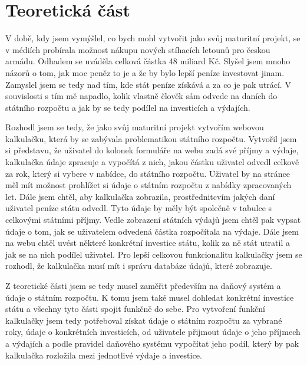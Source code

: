 \documentclass[11pt,a4paper,twoside,openright]{report}
\begin{document}


\setcounter{tocdepth}{2}
\tableofcontents

\chapter{Teoretická část}
\pagestyle{fancy}

V době, kdy jsem vymýšlel, co bych mohl vytvořit jako svůj maturitní projekt,
se v médiích probírala možnost nákupu nových stíhacích letounů pro českou armádu.
Odhadem se uváděla celková částka 48 miliard Kč. Slyšel jsem mnoho názorů o tom,
jak moc peněz to je a že by bylo lepší peníze investovat jinam. Zamyslel jsem se
tedy nad tím, kde stát peníze získává a za co je pak utrácí. V souvislosti s tím mě napadlo,
kolik vlastně člověk sám odvede na daních do státního rozpočtu a jak by se tedy
podílel na investicích a výdajích. 

Rozhodl jsem se tedy, že jako svůj maturitní projekt vytvořím webovou kalkulačku,
která by se zabývala problematikou státního rozpočtu. Vytvořil jsem si představu,
že uživatel do kolonek formuláře na webu zadá své příjmy a výdaje, kalkulačka údaje
zpracuje a vypočítá z nich, jakou částku uživatel odvedl celkově za rok, který si
vybere v nabídce, do státního rozpočtu. Uživatel by na stránce měl mít možnost prohlížet
si údaje o státním rozpočtu z nabídky zpracovaných let. Dále jsem chtěl, aby kalkulačka
zobrazila, prostřednitcvím jakých daní uživatel peníze státu odvedl. Tyto údaje by měly být
společně v tabulce s celkovými státními příjmy. Vedle zobrazení státních výdajů
jsem chtěl pak vypsat údaje o tom, jak se uživatelem odvedená částka rozpočítala na výdaje.
Dále jsem na webu chtěl uvést některé konkrétní investice státu, kolik za ně stát utratil
a jak se na nich podílel uživatel. Pro lepší celkovou funkcionalitu kalkulačky jsem se
rozhodl, že kalkulačka musí mít i správu databáze údajů, které zobrazuje.

Z teoretické části jsem se tedy musel zaměřit především na daňový systém a údaje o státním rozpočtu.
K tomu jsem také musel dohledat konkrétní investice státu a všechny tyto části spojit
funkčně do sebe. Pro vytvoření funkční kalkulačky jsem tedy potřeboval získat údaje o státním
rozpočtu za vybrané roky, údaje o konkrétních investicích, od uživatele přijmout údaje
o jeho příjmech a výdajích a podle pravidel daňového systému vypočítat jeho podíl, který by pak
kalkulačka rozložila mezi jednotlivé výdaje a investice.
\end{document}
